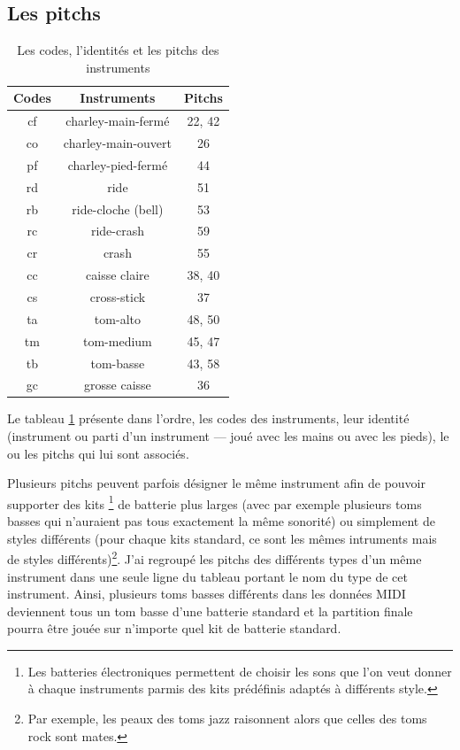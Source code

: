 \subsection*{Les pitchs}
\begin{table}[h]
	\centering
	\begin{tabular}{|c|c|c|} \hline
		Codes & Instruments & Pitchs \\ \hline
		cf & charley-main-fermé & 22, 42 \\
		co & charley-main-ouvert & 26 \\
		pf & charley-pied-fermé & 44 \\
		rd & ride & 51 \\
		rb & ride-cloche (bell) & 53 \\
		rc & ride-crash & 59 \\
		cr & crash & 55 \\
		cc & caisse claire & 38, 40 \\
		cs & cross-stick & 37 \\
		ta & tom-alto & 48, 50 \\
		tm & tom-medium & 45, 47 \\
		tb & tom-basse & 43, 58 \\
		gc & grosse caisse & 36 \\ \hline
	\end{tabular}
	\caption{Les codes, l’identités et les pitchs des instruments}
	\label{pitchs_instru}
\end{table}
Le tableau \ref{pitchs_instru} présente dans l’ordre, les codes des
instruments, leur identité (instrument ou parti d’un instrument — joué avec les
mains ou avec les pieds), le ou les pitchs qui lui sont associés.

Plusieurs pitchs peuvent parfois désigner le même instrument afin de pouvoir
supporter des kits \footnote{Les batteries électroniques permettent de choisir
les sons que l’on veut donner à chaque instruments parmis des kits prédéfinis
adaptés à différents style.} de batterie plus larges (avec par exemple plusieurs
toms basses qui n’auraient pas tous exactement la même sonorité) ou simplement
de styles différents (pour chaque kits standard, ce sont les mêmes intruments
mais de styles différents)\footnote{Par exemple, les peaux des toms jazz
raisonnent alors que celles des toms rock sont mates.}. J’ai regroupé les pitchs des
différents types d’un même instrument dans une seule ligne du tableau portant
le nom du type de cet instrument. Ainsi,
plusieurs toms basses différents dans les données MIDI deviennent tous un tom
basse d’une batterie standard et la partition finale pourra être jouée sur
n’importe quel kit de batterie standard.

